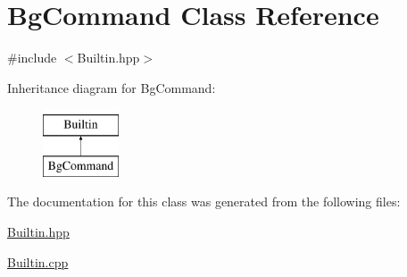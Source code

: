 \hypertarget{classBgCommand}{
\section{BgCommand Class Reference}
\label{classBgCommand}
}


{\ttfamily \#include $<$Builtin.hpp$>$}

Inheritance diagram for BgCommand:\begin{figure}[H]
\begin{center}
\leavevmode
\includegraphics[height=2.000000cm]{classBgCommand}
\end{center}
\end{figure}


The documentation for this class was generated from the following files:\begin{DoxyCompactItemize}
\item 
\hyperlink{Builtin_8hpp}{Builtin.hpp}\item 
\hyperlink{Builtin_8cpp}{Builtin.cpp}\end{DoxyCompactItemize}
